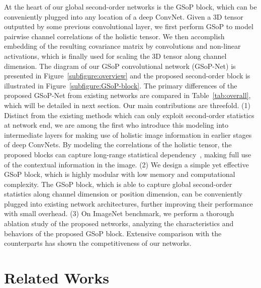 \documentclass[10pt,twocolumn,letterpaper]{article}
\begin{document}
At the heart of our global second-order networks is the GSoP block,  which can be conveniently plugged into any location of a deep ConvNet.  Given a 3D  tensor outputted by some previous convolutional  layer, we first perform  GSoP to model pairwise  channel correlations of the holistic tensor. We then accomplish embedding of the resulting covariance matrix by convolutions and non-linear activations, which is finally used for scaling the 3D tensor along  channel dimension. The diagram of our GSoP convolutional network (GSoP-Net) is presented in Figure~\ref{subfigure:overview} and the proposed second-order block is illustrated in Figure~\ref{subfigure:GSoP-block}. The primary differences of the proposed GSoP-Net from existing networks are compared in Table~\ref{tab:overall}, which will be detailed in next section. Our main contributions are threefold.  (1) Distinct from the existing methods which can only exploit second-order statistics at network end, we are among the first who  introduce  this modeling into intermediate  layers for making use of holistic image information in earlier stages of deep ConvNets.   By modeling the correlations of  the holistic tensor, the proposed blocks can capture  long-range statistical dependency~\cite{Wang_2018_CVPR_nonlocal}, making full use of the contextual information in the image. (2) We design a simple yet effective GSoP block, which is highly modular with  low memory and computational complexity.  The GSoP block, which is able to capture global second-order statistics along channel dimension or position dimension,  can be conveniently  plugged into existing network architectures, further improving their performance with small overhead. (3)  On ImageNet benchmark, we perform a thorough ablation study of the proposed  networks, analyzing the characteristics and behaviors of the proposed GSoP block. Extensive comparison with the counterparts has shown the competitiveness of our networks.
 
\section{Related Works}\label{section:related-work}
\end{document}
